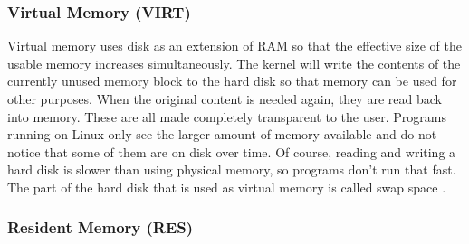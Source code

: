 \subsubsection{Virtual Memory (VIRT)}

Virtual memory uses disk as an extension of RAM so that the effective size of the usable memory increases simultaneously. The kernel will write the contents of the currently unused memory block to the hard disk so that memory can be used for other purposes. When the original content is needed again, they are read back into memory. These are all made completely transparent to the user. Programs running on Linux only see the larger amount of memory available and do not notice that some of them are on disk over time. Of course, reading and writing a hard disk is slower than using physical memory, so programs don't run that fast. The part of the hard disk that is used as virtual memory is called swap space \cite{site:ltdp}.

\subsubsection{Resident Memory (RES)}


